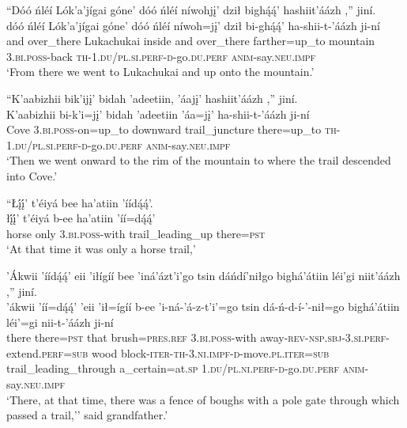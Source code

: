 \ea\label{ex:text2-15-2}
``Dóó ńléí Lók’a’jígai góne’ dóó ńléí níwohjį’ dził bighą́ą́’ hashiit’áázh ,'' jiní.\\
\gll dóó	ńléí	Lók’a’jígai	góne’	dóó	ńléí	níwoh=jį’	dził	bi-ghą́ą́’	ha-shii-t-’áázh	ji-ní\\
     and	over\_there	Lukachukai	inside	and	over\_there	farther=up\_to	mountain	3.\textsc{bi}.\textsc{poss}-back	\textsc{th}-1.\textsc{du}/\textsc{pl}.\textsc{si}.\textsc{perf}-\textsc{d}-go.\textsc{du}.\textsc{perf}	\textsc{anim}-say.\textsc{neu}.\textsc{impf}\\
\glt `From there we went to Lukachukai and up onto the mountain.'
\z

\ea\label{ex:text2-15-3}
``K’aabizhii bik’ijį’ bidah ’adeetiin, ’áajį’ hashiit’áázh ,'' jiní.\\
\gll K’aabizhii	bi-k’i=jį’	bidah	’adeetiin	’áa=jį’	ha-shii-t-’áázh	ji-ní\\
     Cove	3.\textsc{bi}.\textsc{poss}-on=up\_to	downward	trail\_juncture	there=up\_to	\textsc{th}-1.\textsc{du}/\textsc{pl}.\textsc{si}.\textsc{perf}-\textsc{d}-go.\textsc{du}.\textsc{perf}	\textsc{anim}-say.\textsc{neu}.\textsc{impf}\\
\glt `Then we went onward to the rim of the mountain to where the trail descended into Cove.'
\z

\ea\label{ex:text2-15-4}
``Łį́į́’ t’éiyá bee ha’atiin ’íídą́ą́’.\\
\gll łį́į́’	t’éiyá	b-ee	ha’atiin	’íí=dą́ą́’\\
     horse	only	3.\textsc{bi}.\textsc{poss}-with	trail\_leading\_up	there=\textsc{pst}\\
\glt `At that time it was only a horse trail,'
\z

\ea\label{ex:text2-15-5}
’Ákwii ’íídą́ą́’ eii ’iłígíí bee ’iná’ázt’i’go tsin dáńdí’niłgo bighá’átiin léi’gi niit’áázh ,'' jiní.\\
\gll ’ákwii	’íí=dą́ą́’	’eii	’ił=ígíí	b-ee	’i-ná-’á-z-t’i’=go	tsin	dá-ń-d-í-’-nił=go	bighá’átiin	léi’=gi	nii-t-’áázh	ji-ní\\
     there	there=\textsc{pst}	that	brush=\textsc{pres}.\textsc{ref}	3.\textsc{bi}.\textsc{poss}-with	away-\textsc{rev}-\textsc{nsp}.\textsc{sbj}-3.\textsc{si}.\textsc{perf}-extend.\textsc{perf}=\textsc{sub}	wood	block-\textsc{iter}-\textsc{th}-3.\textsc{ni}.\textsc{impf}-\textsc{d}-move.\textsc{pl}.\textsc{iter}=\textsc{sub}	trail\_leading\_through	a\_certain=at.\textsc{sp}	1.\textsc{du}/\textsc{pl}.\textsc{ni}.\textsc{perf}-\textsc{d}-go.\textsc{du}.\textsc{perf}	\textsc{anim}-say.\textsc{neu}.\textsc{impf}\\
\glt `There, at that time, there was a fence of boughs with a pole gate through which passed a trail,'' said grandfather.'
\z

